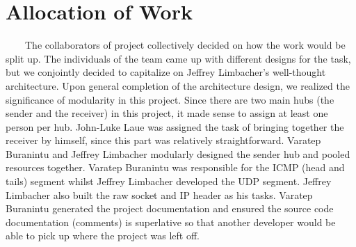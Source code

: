 \documentclass[11pt]{article}
\begin{document}
\section{Allocation of Work}
\ \ \ \ The collaborators of project collectively decided on how the work would be split up. The individuals of the team came up with different designs for the task, but we conjointly decided to capitalize on Jeffrey Limbacher's well-thought architecture. Upon general completion of the architecture design, we realized the significance of modularity in this project. Since there are two main hubs (the sender and the receiver) in this project, it made sense to assign at least one person per hub. John-Luke Laue was assigned the task of bringing together the receiver by himself, since this part was relatively straightforward. Varatep Buranintu and Jeffrey Limbacher modularly designed the sender hub and pooled resources together. Varatep Buranintu was responsible for the ICMP (head and tails) segment whilst Jeffrey Limbacher developed the UDP segment. Jeffrey Limbacher also built the raw socket and IP header as his tasks. Varatep Buranintu generated the project documentation and ensured the source code documentation (comments) is superlative so that another developer would be able to pick up where the project was left off.
\end{document}
